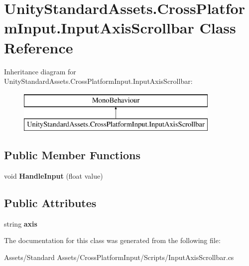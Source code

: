 \hypertarget{class_unity_standard_assets_1_1_cross_platform_input_1_1_input_axis_scrollbar}{}\section{Unity\+Standard\+Assets.\+Cross\+Platform\+Input.\+Input\+Axis\+Scrollbar Class Reference}
\label{class_unity_standard_assets_1_1_cross_platform_input_1_1_input_axis_scrollbar}
Inheritance diagram for Unity\+Standard\+Assets.\+Cross\+Platform\+Input.\+Input\+Axis\+Scrollbar\+:\begin{figure}[H]
\begin{center}
\leavevmode
\includegraphics[height=2.000000cm]{class_unity_standard_assets_1_1_cross_platform_input_1_1_input_axis_scrollbar}
\end{center}
\end{figure}
\subsection*{Public Member Functions}
\begin{DoxyCompactItemize}
\item 
void {\bfseries Handle\+Input} (float value)\hypertarget{class_unity_standard_assets_1_1_cross_platform_input_1_1_input_axis_scrollbar_a67a8adfeb9772b29115dfb34c52b11d0}{}\label{class_unity_standard_assets_1_1_cross_platform_input_1_1_input_axis_scrollbar_a67a8adfeb9772b29115dfb34c52b11d0}

\end{DoxyCompactItemize}
\subsection*{Public Attributes}
\begin{DoxyCompactItemize}
\item 
string {\bfseries axis}\hypertarget{class_unity_standard_assets_1_1_cross_platform_input_1_1_input_axis_scrollbar_ab06d4ff9319d7a63b3d6522249227ec6}{}\label{class_unity_standard_assets_1_1_cross_platform_input_1_1_input_axis_scrollbar_ab06d4ff9319d7a63b3d6522249227ec6}

\end{DoxyCompactItemize}


The documentation for this class was generated from the following file\+:\begin{DoxyCompactItemize}
\item 
Assets/\+Standard Assets/\+Cross\+Platform\+Input/\+Scripts/Input\+Axis\+Scrollbar.\+cs\end{DoxyCompactItemize}

